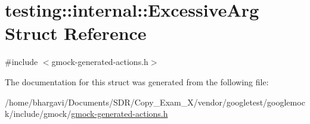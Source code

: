\hypertarget{structtesting_1_1internal_1_1_excessive_arg}{}\section{testing\+:\+:internal\+:\+:Excessive\+Arg Struct Reference}
\label{structtesting_1_1internal_1_1_excessive_arg}


{\ttfamily \#include $<$gmock-\/generated-\/actions.\+h$>$}



The documentation for this struct was generated from the following file\+:\begin{DoxyCompactItemize}
\item 
/home/bhargavi/\+Documents/\+S\+D\+R/\+Copy\+\_\+\+Exam\+\_\+X/vendor/googletest/googlemock/include/gmock/\hyperlink{gmock-generated-actions_8h}{gmock-\/generated-\/actions.\+h}\end{DoxyCompactItemize}
